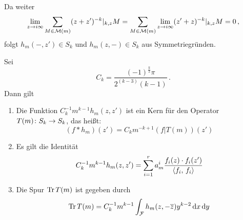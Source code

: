 Da weiter
\begin{align*}
\lim_{z \to i\infty} \sum_{M \in \mathcal{M}(m)} (z+z')^{-k}|_{k,z} M
= \sum_{M \in \mathcal{M}(m)} \lim_{z \to i\infty} (z'+z)^{-k}|_{k,z} M
= 0\,,
\end{align*}
folgt $h_m(-, z') \in S_k$ und $h_m(z, -) \in S_k$ aus Symmetriegründen.


\begin{satz}\label{analytischeSpurformel}
	Sei
	\begin{equation}%
	C_k = \frac{(-1)^{\frac{k}{2}} \pi}{2^{(k-3)}(k-1)}\,.
	\end{equation}
	Dann gilt
	\begin{enumerate}
		\item Die Funktion $C_k^{-1} m^{k-1} h_m(z,z')$ ist ein Kern für den Operator $T(m)\colon S_k \rightarrow S_k$, das heißt:
		\begin{equation}\label{eq:faltung_hm}%
		(f * h_m)(z') = C_km^{-k+1} (f|T(m))(z')
		\end{equation}
		\item Es gilt die Identität 
		\begin{equation}%
		C_k^{-1} m^{k-1} h_m(z,z') = \sum_{i=1}^r a_m^i \frac{f_i(z) \cdot f_i(z')}{\scalarprd{f_i}{f_i}}
		\end{equation}
		\item Die Spur $\operatorname{Tr} T(m)$ ist gegeben durch
		\begin{equation}%
		\Tr T(m) = C_k^{-1} m^{k-1} \int_\F h_m(z, -\conj z) y^{k-2} \opd x \opd y
		\end{equation}
	\end{enumerate}
\end{satz}

